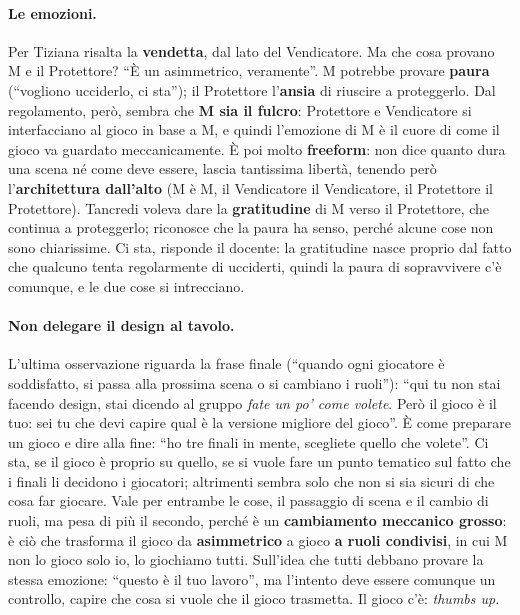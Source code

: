 \paragraph{Le emozioni.} Per Tiziana risalta la \textbf{vendetta}, dal lato del
Vendicatore. Ma che cosa provano M e il Protettore? ``È un asimmetrico, veramente''.
M potrebbe provare \textbf{paura} (``vogliono ucciderlo, ci sta''); il Protettore
l'\textbf{ansia} di riuscire a proteggerlo. Dal regolamento, però, sembra che
\textbf{M sia il fulcro}: Protettore e Vendicatore si interfacciano al gioco in base a
M, e quindi l'emozione di M è il cuore di come il gioco va guardato meccanicamente. È
poi molto \textbf{freeform}: non dice quanto dura una scena né come deve essere, lascia
tantissima libertà, tenendo però l'\textbf{architettura dall'alto} (M è M, il
Vendicatore il Vendicatore, il Protettore il Protettore). Tancredi voleva dare la
\textbf{gratitudine} di M verso il Protettore, che continua a proteggerlo; riconosce
che la paura ha senso, perché alcune cose non sono chiarissime. Ci sta, risponde il
docente: la gratitudine nasce proprio dal fatto che qualcuno tenta regolarmente di
ucciderti, quindi la paura di sopravvivere c'è comunque, e le due cose si
intrecciano.

\paragraph{Non delegare il design al tavolo.} L'ultima osservazione riguarda la frase
finale (``quando ogni giocatore è soddisfatto, si passa alla prossima scena o si
cambiano i ruoli''): ``qui tu non stai facendo design, stai dicendo al gruppo
\emph{fate un po' come volete}. Però il gioco è il tuo: sei tu che devi capire qual è
la versione migliore del gioco''. È come preparare un gioco e dire alla fine: ``ho tre
finali in mente, scegliete quello che volete''. Ci sta, se il gioco è proprio su
quello, se si vuole fare un punto tematico sul fatto che i finali li decidono i
giocatori; altrimenti sembra solo che non si sia sicuri di che cosa far giocare.
Vale per entrambe le cose, il passaggio di scena e il cambio di ruoli, ma pesa di più
il secondo, perché è un \textbf{cambiamento meccanico grosso}: è ciò che trasforma il
gioco da \textbf{asimmetrico} a gioco \textbf{a ruoli condivisi}, in cui M non lo gioco
solo io, lo giochiamo tutti. Sull'idea che tutti debbano provare la stessa emozione:
``questo è il tuo lavoro'', ma l'intento deve essere comunque un controllo, capire
che cosa si vuole che il gioco trasmetta. Il gioco c'è: \emph{thumbs up}.


